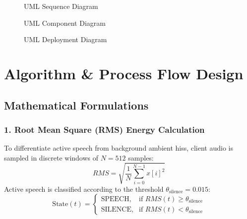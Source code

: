 \documentclass[12pt,a4paper]{report}
\begin{document}
\begin{figure}[H]
  \centering
  \caption{UML Sequence Diagram}
  \label{fig:fig4_7}
\end{figure}

\begin{figure}[H]
  \centering
  \caption{UML Component Diagram}
  \label{fig:fig4_8}
\end{figure}

\begin{figure}[H]
  \centering
  \caption{UML Deployment Diagram}
  \label{fig:fig4_9}
\end{figure}

\section{Algorithm \& Process Flow Design}
\subsection{Mathematical Formulations}

\subsubsection{1. Root Mean Square (RMS) Energy Calculation}
To differentiate active speech from background ambient hiss, client audio is sampled in discrete windows of $N=512$ samples:
\begin{equation}
RMS = \sqrt{\frac{1}{N} \sum_{i=0}^{N-1} x[i]^2}
\end{equation}
Active speech is classified according to the threshold $\theta_{\text{silence}} = 0.015$:
\begin{equation}
\text{State}(t) = \begin{cases}
\text{SPEECH}, & \text{if } RMS(t) \ge \theta_{\text{silence}} \\
\text{SILENCE}, & \text{if } RMS(t) < \theta_{\text{silence}}
\end{cases}
\end{equation}
\end{document}
